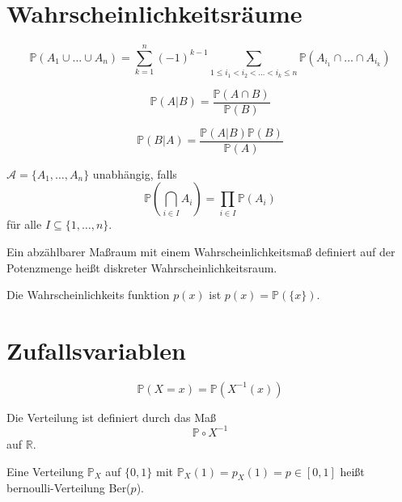 \documentclass[prb,12pt, twocolumn]{revtex4-2}
\theoremstyle{definition}
\theoremstyle{definition}
\theoremstyle{definition}
\newcommand{\R}{\mathbb{R}}
\begin{document}
\section{Wahrscheinlichkeitsräume}
\begin{Note}
\begin{widetext}
\[\mathbb{P}(A_1\cup \dots \cup A_n)=\sum_{k=1}^n (-1)^{k-1}\sum_{1\le i_1< i_2<\dots < i_k\le n}\mathbb{P}(A_{i_1}\cap \dots \cap A_{i_k})\]
\end{widetext}
\end{Note}
\begin{Note}
\[\mathbb{P}(A|B)=\frac{\mathbb{P}(A\cap B)}{\mathbb{P}(B)}\]
\end{Note}
\begin{Note}
\[\mathbb{P}(B|A)=\frac{\mathbb{P}(A|B)\mathbb{P}(B)}{\mathbb{P}(A)}\]
\end{Note}
\begin{Note} $\mathcal{A}=\{A_1, \dots, A_n\}$ unabhängig, falls
\[\mathbb{P}\left(\bigcap_{i\in I} A_i\right)=\prod_{i\in I}\mathbb{P}(A_i)\]
für alle $I\subseteq \{1,\dots, n\}$.	
\end{Note}
\begin{Note}[Diskret]
	Ein abzählbarer Maßraum mit einem Wahrscheinlichkeitsmaß definiert auf der Potenzmenge heißt diskreter Wahrscheinlichkeitsraum.
\end{Note}
\begin{Note}[Wahrscheinlichkeitsfunktion]
	Die Wahrscheinlichkeits funktion $p(x)$ ist $p(x) = \mathbb{P}(\{x\})$. 
\end{Note}
\section{Zufallsvariablen}
\begin{Note}
	\[\mathbb{P}(X = x) = \mathbb{P}(X^{-1}(x))\]
\end{Note}
\begin{Note}[Verteilung]
	Die Verteilung ist definiert durch das Maß
	\[\mathbb{P}\circ X^{-1}\]
	auf $\R$.
\end{Note}
\begin{Note}
	Eine Verteilung $\mathbb{P}_X$ auf $\{0, 1\}$ mit $\mathbb{P}_X (1) = p_X(1) = p \in [0, 1]$ heißt bernoulli-Verteilung Ber($p$).
\end{Note}
\end{document}
